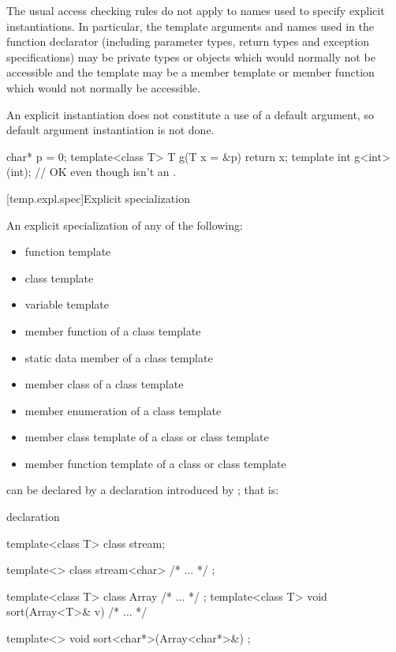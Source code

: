 \pnum
The usual access checking rules do not apply to names used to specify
explicit instantiations.
\enternote
In particular, the template arguments and names used in the function
declarator (including parameter types, return types and exception
specifications) may be private types or objects which would normally
not be accessible and the template may be a member template or member
function which would not normally be accessible.
\exitnote

\pnum
An explicit instantiation does not constitute a use of a default argument,
so default argument instantiation is not done.
\enterexample

\begin{codeblock}
char* p = 0;
template<class T> T g(T x = &p) { return x; }
template int g<int>(int);       // OK even though  isn't an .
\end{codeblock}
\exitexample

[temp.expl.spec]{Explicit specialization}

\pnum
{}%
An explicit specialization of any of the following:

\begin{itemize}
\item
function template
\item
class template
\item
variable template
\item
member function of a class template
\item
static data member of a class template
\item
member class of a class template
\item
member enumeration of a class template
\item
member class template of a class or class template
\item
member function template of a class or class template
\end{itemize}

can be declared by a declaration introduced by
;
that is:
%

\begin{bnf}
\br
   declaration
\end{bnf}

\enterexample
\begin{codeblock}
template<class T> class stream;

template<> class stream<char> { /* ... */ };

template<class T> class Array { /* ... */ };
template<class T> void sort(Array<T>& v) { /* ... */ }

template<> void sort<char*>(Array<char*>&) ;
\end{codeblock}

